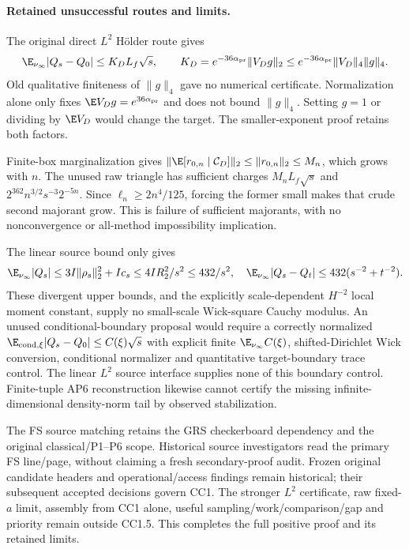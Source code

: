 \paragraph{Retained unsuccessful routes and limits.}
The original direct $L^2$ H\"older route gives
\[
 \E_{\nu_\infty}|Q_s-Q_0|\le K_DL_f\sqrt s,\qquad
 K_D=e^{-36\alpha_{\mathrm{pr}}}\|V_Dg\|_2
 \le e^{-36\alpha_{\mathrm{pr}}}\|V_D\|_4\|g\|_4.
\]
Old qualitative finiteness of $\|g\|_4$ gave no numerical certificate.
Normalization alone only fixes $\E V_Dg=e^{36\alpha_{\mathrm{pr}}}$ and
does not bound $\|g\|_4$. Setting $g=1$ or dividing by $\E V_D$ would change
the target. The smaller-exponent proof retains both factors.

Finite-box marginalization gives
$\|\E[r_{0,n}\mid\mathcal C_D]\|_2\le\|r_{0,n}\|_2\le M_n$,
which grows with $n$. The unused raw triangle has sufficient charges
$M_nL_f\sqrt s$ and $2^{362}n^{3/2}s^{-3}2^{-5n}$.
Since $\ell_n\ge2n^4/125$, forcing the former small makes that crude
second majorant grow. This is failure of sufficient majorants, with no
nonconvergence or all-method impossibility implication.

The linear source bound only gives
\[
 \E_{\nu_\infty}|Q_s|\le3I\|\rho_s\|_2^2+Ic_s
 \le4IR_2^2/s^2\le432/s^2,\quad
 \E_{\nu_\infty}|Q_s-Q_t|\le432(s^{-2}+t^{-2}).
\]
These divergent upper bounds, and the explicitly scale-dependent $H^{-2}$
local moment constant, supply no small-scale Wick-square Cauchy modulus.
An unused conditional-boundary proposal would require a correctly normalized
$\E_{\mathrm{cond},\xi}|Q_s-Q_0|\le C(\xi)\sqrt s$ with explicit finite
$\E_{\nu_\infty}C(\xi)$, shifted-Dirichlet Wick conversion, conditional
normalizer and quantitative target-boundary trace control. The linear
$L^2$ source interface supplies none of this boundary control.
Finite-tuple AP6 reconstruction likewise cannot certify the missing
infinite-dimensional density-norm tail by observed stabilization.

The FS source matching retains the GRS checkerboard dependency and the
original classical/P1--P6 scope. Historical source investigators read the
primary FS line/page, without claiming a fresh secondary-proof audit.
Frozen original candidate headers and operational/access findings
remain historical; their subsequent accepted decisions govern CC1.
The stronger $L^2$ certificate, raw fixed-$a$ limit, assembly from
CC1 alone, useful sampling/work/comparison/gap and priority remain outside
CC1.5. This completes the full positive proof and its retained limits.

